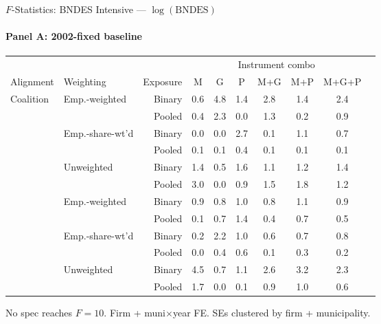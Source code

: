 \documentclass[aspectratio=169,10pt]{beamer}
\begin{document}
\begin{frame}[t]{$F$-Statistics: BNDES Intensive --- $\log(\text{BNDES})$}
\framesubtitle{Panel A: 2002-fixed baseline}
\begin{center}
\footnotesize
\setlength{\tabcolsep}{3.5pt}
\renewcommand{\arraystretch}{1.05}
\begin{tabular}{@{}llrccccccc@{}}
\toprule
 & & & \multicolumn{6}{c}{Instrument combo} \\
\cmidrule(l{2pt}r{2pt}){4-9}
Alignment & Weighting & Exposure & M & G & P & M+G & M+P & M+G+P \\
\midrule
  \multirow{6}{*}{Coalition} & \multirow{2}{*}{Emp.-weighted} & Binary & 0.6 & 4.8 & 1.4 & 2.8 & 1.4 & 2.4 \\
   &  & Pooled & 0.4 & 2.3 & 0.0 & 1.3 & 0.2 & 0.9 \\
   & \multirow{2}{*}{Emp.-share-wt'd} & Binary & 0.0 & 0.0 & 2.7 & 0.1 & 1.1 & 0.7 \\
   &  & Pooled & 0.1 & 0.1 & 0.4 & 0.1 & 0.1 & 0.1 \\
   & \multirow{2}{*}{Unweighted} & Binary & 1.4 & 0.5 & 1.6 & 1.1 & 1.2 & 1.4 \\
   &  & Pooled & 3.0 & 0.0 & 0.9 & 1.5 & 1.8 & 1.2 \\
\addlinespace[5pt]
  \multirow{6}{*}{Party} & \multirow{2}{*}{Emp.-weighted} & Binary & 0.9 & 0.8 & 1.0 & 0.8 & 1.1 & 0.9 \\
   &  & Pooled & 0.1 & 0.7 & 1.4 & 0.4 & 0.7 & 0.5 \\
   & \multirow{2}{*}{Emp.-share-wt'd} & Binary & 0.2 & 2.2 & 1.0 & 0.6 & 0.7 & 0.8 \\
   &  & Pooled & 0.0 & 0.4 & 0.6 & 0.1 & 0.3 & 0.2 \\
   & \multirow{2}{*}{Unweighted} & Binary & 4.5 & 0.7 & 1.1 & 2.6 & 3.2 & 2.3 \\
   &  & Pooled & 1.7 & 0.0 & 0.1 & 0.9 & 1.0 & 0.6 \\
\bottomrule
\end{tabular}
\end{center}
{\scriptsize No spec reaches $F=10$. Firm + muni$\times$year FE. SEs clustered by firm + municipality.}
\end{frame}
\end{document}
